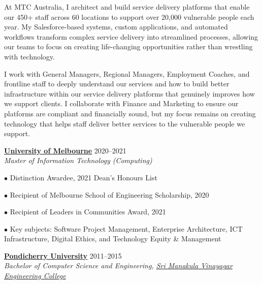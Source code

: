 \documentclass[11pt,article,oneside]{memoir}
\begin{document}
\medskip

\reversemarginpar
\bigskip       


\ind At MTC Australia, I architect and build service delivery platforms that enable our 450+ staff across 60 locations to support over 20,000 vulnerable people each year. My Salesforce-based systems, custom applications, and automated workflows transform complex service delivery into streamlined processes, allowing our teams to focus on creating life-changing opportunities rather than wrestling with technology.

\medskip

\ind I work with General Managers, Regional Managers, Employment Coaches, and frontline staff to deeply understand our services and how to build better infrastructure within our service delivery platforms that genuinely improves how we support clients. I collaborate with Finance and Marketing to ensure our platforms are compliant and financially sound, but my focus remains on creating technology that helps staff deliver better services to the vulnerable people we support.

\bigskip


\ind \textbf{\href{https://www.unimelb.edu.au/}{University of Melbourne}} \hfill 2020--2021 \\
\ind \emph{Master of Information Technology (Computing)}

\ind \hspace{0.35in} $\bullet$ Distinction Awardee, 2021 Dean's Honours List

\ind \hspace{0.35in} $\bullet$ Recipient of Melbourne School of Engineering Scholarship, 2020

\ind \hspace{0.35in} $\bullet$ Recipient of Leaders in Communities Award, 2021

\ind \hspace{0.35in} $\bullet$ Key subjects: Software Project Management, Enterprise Architecture, ICT Infrastructure, Digital Ethics, and Technology Equity \& Management

\bigskip

\ind \textbf{\href{https://www.pondiuni.edu.in/}{Pondicherry University}} \hfill 2011--2015 \\
\ind \emph{Bachelor of Computer Science and Engineering, \href{https://smvec.ac.in/}{Sri Manakula Vinayagar Engineering College}}
\end{document}
